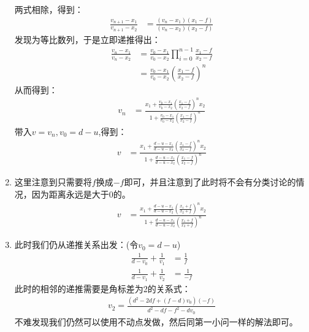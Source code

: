 \begin{enumerate}
\begin{align*}
	\end{align*}
	两式相除，得到：
	\begin{align*}
		\frac{v_{n+1} - x_1}{v_{n+1} - x_2} &= \frac{(v_n - x_1 )(x_1 -f )}{(v_n - x_2 )(x_2 -f )} 
	\end{align*}
	发现为等比数列，于是立即递推得出：
	\begin{align*}
		\frac{v_{n} - x_1}{v_{n} - x_2} &= \frac{v_0 - x_1}{v_0 - x_2} \prod_{i=0}^{n-1} \frac{x_1 -f}{x_2 -f} \\
		&= \frac{v_0 - x_1}{v_0 - x_2} \left(\frac{x_1 -f}{x_2 -f}\right)^n 
	\end{align*}
	从而得到：
	\begin{align*}
		v_n &=\frac{x_1 + \frac{v_0 - x_1}{v_0 - x_2} \left(\frac{x_1 -f}{x_2 -f}\right)^n x_2}{1+ \frac{v_0 - x_1}{v_0 - x_2} \left(\frac{x_1 -f}{x_2 -f}\right)^n} 
	\end{align*}
	带入\(v=v_n, v_0 = d-u\),得到：
	\begin{align*}
		v &= \frac{x_1 + \frac{d-u - x_1}{d-u - x_2} \left(\frac{x_1 -f}{x_2 -f}\right)^n x_2}{1+ \frac{d-u - x_1}{d-u - x_2} \left(\frac{x_1 -f}{x_2 -f}\right)^n} 
	\end{align*}
	\item 这里注意到只需要将\(f\)换成\(-f\)即可，并且注意到了此时将不会有分类讨论的情况，因为距离永远是大于0的。
	\begin{align*}
		v &= \frac{x_1 + \frac{d-u - x_1}{d-u - x_2} \left(\frac{x_1 +f}{x_2 +f}\right)^n x_2}{1+ \frac{d-u - x_1}{d-u - x_2} \left(\frac{x_1 +f}{x_2 +f}\right)^n} 
	\end{align*}
	\item 此时我们仍从递推关系出发：(令\(v_0 = d-u\))
	\begin{align*}
		\frac{1}{d-v_0} + \frac{1}{v_1} &= \frac{1}{f} \\
		\frac{1}{d-v_1} + \frac{1}{v_2} &= \frac{1}{-f}
	\end{align*}
	此时的相邻的递推需要是角标差为2的关系式：
	\begin{align*}
		v_2 = \frac{(d^2 - 2df + (f-d)v_0)(-f)}{d^2-df-f^2-dv_0}
	\end{align*}
	不难发现我们仍然可以使用不动点发做，然后同第一小问一样的解法即可。

\end{enumerate}
